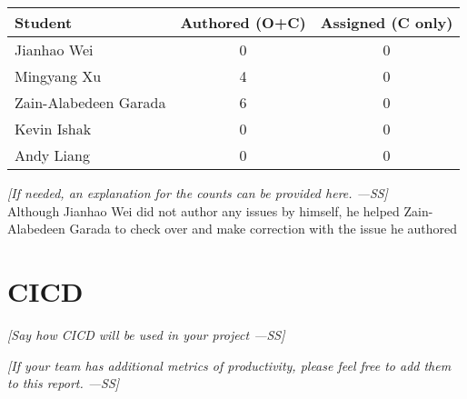 \documentclass[12pt]{article}
\begin{document}
\begin{longtable}{|l|c|c|}
\hline
\textbf{Student} & \textbf{Authored (O+C)} & \textbf{Assigned (C only)} \\
\hline
Jianhao Wei & 0 & 0 \\
Mingyang Xu & 4 & 0 \\
Zain-Alabedeen Garada & 6 & 0 \\
Kevin Ishak & 0 & 0 \\
Andy Liang & 0 & 0 \\
\hline
\end{longtable}

\textit{[If needed, an explanation for the counts can be provided here. ---SS]}
\\Although Jianhao Wei did not author any issues by himself, he helped Zain-Alabedeen Garada to check over and make correction with the issue he authored

\section{CICD}
\textit{[Say how CICD will be used in your project ---SS]}

\textit{[If your team has additional metrics of productivity, please feel free to add them to this report. ---SS]}
\end{document}
